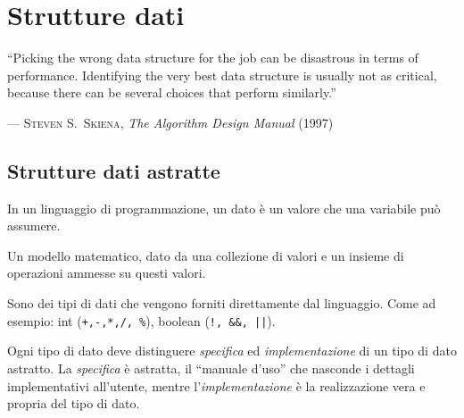 
\ifsubfile
\usepackage{../settings/subfile}
\setcounter{chapter}{3}

\usepackage[newfloat, cachedir=_minted-cache, outputdir=../build]{minted}
\usepackage{../libraries/set-minted}


\fi
\chapter{Strutture dati}
\epigraph{\enquote{Picking the wrong data structure for the job can be disastrous in terms of performance.
				   Identifying the very best data structure is usually not as critical, because there can be several choices that perform similarly.}}%
		 {--- \textsc{Steven S.\ Skiena}, \emph{The Algorithm Design Manual} (1997)}

\section{Strutture dati astratte}

\begin{definition}
In un linguaggio di programmazione, un dato è un valore che una variabile può assumere.
\end{definition}

\begin{definition}
Un modello matematico, dato da una collezione di valori e un insieme di operazioni ammesse su questi valori.
\end{definition}

\begin{definition}
Sono dei tipi di dati che vengono forniti direttamente dal linguaggio.
Come ad esempio: int (\texttt{+,-,*,/, \%}), boolean (\texttt{!, \&\&, ||}).
\end{definition}

Ogni tipo di dato deve distinguere \emph{specifica} ed \emph{implementazione} di un tipo di dato astratto.
La \emph{specifica} è astratta, il \enquote{manuale d'uso} che nasconde i dettagli implementativi all'utente, mentre l'\emph{implementazione} è la realizzazione vera e propria del tipo di dato.

